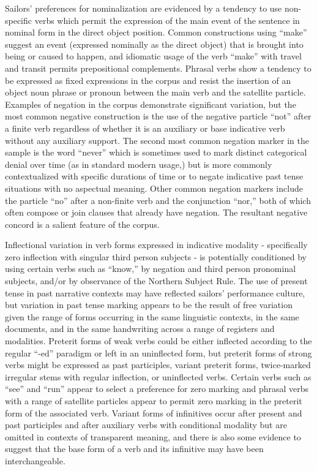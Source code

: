   Sailors’ preferences for nominalization are evidenced by a tendency to use non-specific verbs which permit the expression of the main event of the sentence in nominal form in the direct object position. Common constructions using “make” suggest an event (expressed nominally as the direct object) that is brought into being or caused to happen, and idiomatic usage of the verb “make” with travel and transit permits prepositional complements. Phrasal verbs show a tendency to be expressed as fixed expressions in the corpus and resist the insertion of an object noun phrase or pronoun between the main verb and the satellite particle. Examples of negation in the corpus demonstrate significant variation, but the most common negative construction is the use of the negative particle “not” after a finite verb regardless of whether it is an auxiliary or base indicative verb without any auxiliary support. The second most common negation marker in the sample is the word “never” which is sometimes used to mark distinct categorical denial over time (as in standard modern usage,) but is more commonly contextualized with specific durations of time or to negate indicative past tense situations with no aspectual meaning. Other common negation markers include the particle “no” after a non-finite verb and the conjunction “nor,” both of which often compose or join clauses that already have negation. The resultant negative concord is a salient feature of the corpus. 

Inflectional variation in verb forms expressed in indicative modality - specifically zero inflection with singular third person subjects - is potentially conditioned by using certain verbs such as “know,” by negation and third person pronominal subjects, and/or by observance of the Northern Subject Rule. The use of present tense in past narrative contexts may have reflected sailors’ performance culture, but variation in past tense marking appears to be the result of free variation given the range of forms occurring in the same linguistic contexts, in the same documents, and in the same handwriting across a range of registers and modalities. Preterit forms of weak verbs could be either inflected according to the regular “-ed” paradigm or left in an uninflected form, but preterit forms of strong verbs might be expressed as past participles, variant preterit forms, twice-marked irregular stems with regular inflection, or uninflected verbs. Certain verbs such as “see” and “run” appear to select a preference for zero marking and phrasal verbs with a range of satellite particles appear to permit zero marking in the preterit form of the associated verb. Variant forms of infinitives occur after present and past participles and after auxiliary verbs with conditional modality but are omitted in contexts of transparent meaning, and there is also some evidence to suggest that the base form of a verb and its infinitive may have been interchangeable.

